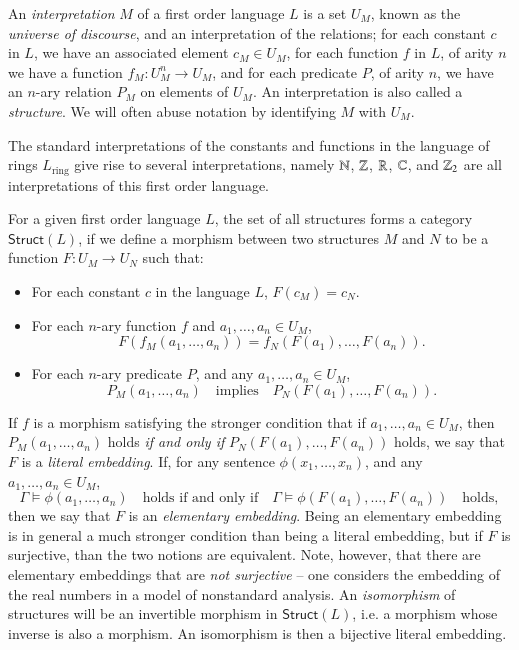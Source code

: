 An \emph{interpretation} $M$ of a first order language $L$ is a set $U_M$, known as the \emph{universe of discourse}, and an interpretation of the relations; for each constant $c$ in $L$, we have an associated element $c_M \in U_M$, for each function $f$ in $L$, of arity $n$ we have a function $f_M: U_M^n \to U_M$, and for each predicate $P$, of arity $n$, we have an $n$-ary relation $P_M$ on elements of $U_M$. An interpretation is also called a \emph{structure}. We will often abuse notation by identifying $M$ with $U_M$.

\begin{example}
    The standard interpretations of the constants and functions in the language of rings $L_{\text{ring}}$ give rise to several interpretations, namely $\operatorname{\mathbb{N}}$, $\operatorname{\mathbb{Z}}$, $\operatorname{\mathbb{R}}$, $\operatorname{\mathbb{C}}$, and $\operatorname{\mathbb{Z}}_2$ are all interpretations of this first order language.
\end{example}

For a given first order language $L$, the set of all structures forms a category $\textsf{Struct}(L)$, if we define a morphism between two structures $M$ and $N$ to be a function $F: U_M \to U_N$ such that:
%
\begin{itemize}
    \item For each constant $c$ in the language $L$, $F(c_M) = c_N$.
    \item For each $n$-ary function $f$ and $a_1,\dots,a_n \in U_M$,
    \[ F(f_M(a_1, \dots, a_n)) = f_N(F(a_1), \dots, F(a_n)). \]
    
    \item For each $n$-ary predicate $P$, and any $a_1,\dots,a_n \in U_M$,
    \[ P_M(a_1,\dots,a_n) \quad\text{implies}\quad P_N(F(a_1),\dots,F(a_n)). \]
\end{itemize}
%
If $f$ is a morphism satisfying the stronger condition that if $a_1,\dots,a_n \in U_M$, then $P_M(a_1,\dots,a_n)$ holds \emph{if and only if} $P_N(F(a_1),\dots,F(a_n))$ holds, we say that $F$ is a \emph{literal embedding}. If, for any sentence $\phi(x_1,\dots,x_n)$, and any $a_1,\dots,a_n \in U_M$,
%
\[ \Gamma \vDash \phi(a_1,\dots,a_n) \quad\text{holds if and only if}\quad \Gamma \vDash \phi(F(a_1),\dots,F(a_n))\quad\text{holds}, \]
%
then we say that $F$ is an \emph{elementary embedding}. Being an elementary embedding is in general a much stronger condition than being a literal embedding, but if $F$ is surjective, than the two notions are equivalent. Note, however, that there are elementary embeddings that are \emph{not surjective} -- one considers the embedding of the real numbers in a model of nonstandard analysis. An \emph{isomorphism} of structures will be an invertible morphism in $\textsf{Struct}(L)$, i.e. a morphism whose inverse is also a morphism. An isomorphism is then a bijective literal embedding.

